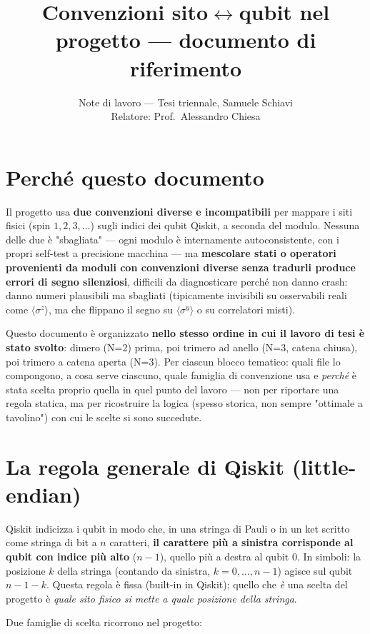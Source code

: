 \documentclass[11pt,a4paper]{article}
\title{Convenzioni sito$\leftrightarrow$qubit nel progetto — documento di riferimento}
\author{Note di lavoro — Tesi triennale, Samuele Schiavi\\ Relatore: Prof.\ Alessandro Chiesa}
\date{}
\begin{document}
\maketitle

\section{Perché questo documento}

Il progetto usa \textbf{due convenzioni diverse e incompatibili} per
mappare i siti fisici (spin $1,2,3,\dots$) sugli indici dei qubit Qiskit,
a seconda del modulo. Nessuna delle due è "sbagliata" — ogni modulo è
internamente autoconsistente, con i propri self-test a precisione
macchina — ma \textbf{mescolare stati o operatori provenienti da moduli
con convenzioni diverse senza tradurli produce errori di segno
silenziosi}, difficili da diagnosticare perché non danno crash: danno
numeri plausibili ma sbagliati (tipicamente invisibili su osservabili
reali come $\langle\sigma^z\rangle$, ma che flippano il segno su
$\langle\sigma^y\rangle$ o su correlatori misti).

Questo documento è organizzato \textbf{nello stesso ordine in cui il
lavoro di tesi è stato svolto}: dimero (N=2) prima, poi trimero ad anello
(N=3, catena chiusa), poi trimero a catena aperta (N=3). Per ciascun
blocco tematico: quali file lo compongono, a cosa serve ciascuno, quale
famiglia di convenzione usa e \emph{perché} è stata scelta proprio quella
in quel punto del lavoro — non per riportare una regola statica, ma per
ricostruire la logica (spesso storica, non sempre "ottimale a
tavolino") con cui le scelte si sono succedute.

\section{La regola generale di Qiskit (little-endian)}

Qiskit indicizza i qubit in modo che, in una stringa di Pauli o in un ket
scritto come stringa di bit a $n$ caratteri, \textbf{il carattere più a
sinistra corrisponde al qubit con indice più alto} ($n-1$), quello più a
destra al qubit $0$. In simboli: la posizione $k$ della stringa (contando
da sinistra, $k=0,\dots,n-1$) agisce sul qubit $n-1-k$. Questa regola è
fissa (built-in in Qiskit); quello che \emph{è} una scelta del progetto è
\emph{quale sito fisico si mette a quale posizione della stringa}.

Due famiglie di scelta ricorrono nel progetto:
\end{document}
